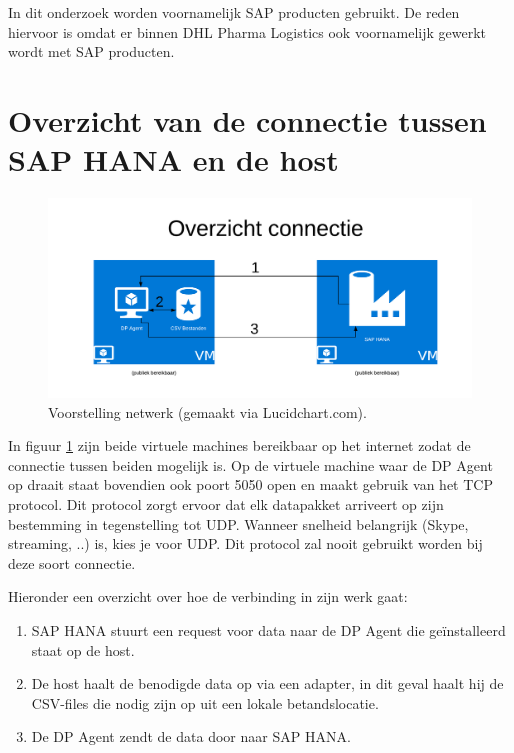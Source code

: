 In dit onderzoek worden voornamelijk SAP producten gebruikt. De reden hiervoor is omdat er binnen DHL Pharma Logistics ook voornamelijk gewerkt wordt met SAP producten.

\section{Overzicht van de connectie tussen SAP HANA en de host}
\begin{figure}[h]
	\centering
	\includegraphics[scale=0.5]{../images/AzureConnectieBP.png}
	\caption{Voorstelling netwerk (gemaakt via Lucidchart.com).}
	\label{fig:azureconn}
\end{figure}

In figuur \ref{fig:azureconn} zijn beide virtuele machines bereikbaar op het internet zodat de connectie tussen beiden mogelijk is. Op de virtuele machine waar de DP Agent op draait staat bovendien ook poort 5050 open en maakt gebruik van het TCP protocol. Dit protocol zorgt ervoor dat elk datapakket arriveert op zijn bestemming in tegenstelling tot UDP. Wanneer snelheid belangrijk (Skype, streaming, ..) is, kies je voor UDP. Dit protocol zal nooit gebruikt worden bij deze soort connectie.

Hieronder een overzicht over hoe de verbinding in zijn werk gaat:

\begin{enumerate}
	\item SAP HANA stuurt een request voor data naar de DP Agent die geïnstalleerd staat op de host.
	\item De host haalt de benodigde data op via een adapter, in dit geval haalt hij de CSV-files die nodig zijn op uit een lokale betandslocatie.
	\item De DP Agent zendt de data door naar SAP HANA.
\end{enumerate}

